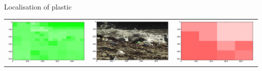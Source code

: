 \documentclass{beamer}
\begin{document}
\begin{frame}{Localisation of plastic}
\begin{tabular}{ccc}
\includegraphics[keepaspectratio=true,width=\segwidth]{images/segment/31_11__animals__.png} &
\includegraphics[keepaspectratio=true,width=\segwidth]{images/segment/31_11__image__.png} &
\includegraphics[keepaspectratio=true,width=\segwidth]{images/segment/31_11__plastic__.png}
\end{tabular}
    \end{frame}
\end{document}
